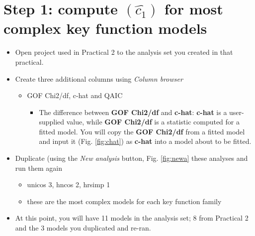 \documentclass[a4paper, 10pt]{article}
\begin{document}
\section{Step 1: compute $(\hat{c_1})$ for most complex key function models}

\begin{itemize}
	\item Open project used in Practical 2 to the analysis set you created in that practical.
	\item Create three additional columns using \emph{Column browser}
	\begin{itemize}
		\item GOF Chi2/df, c-hat and QAIC
		\begin{itemize}
			\item The difference between \textbf{GOF Chi2/df} and \textbf{c-hat}: \textbf{c-hat} is a user-supplied value, while \textbf{GOF Chi2/df} is a statistic computed for a fitted model.  You will copy the \textbf{GOF Chi2/df} from a fitted model and input it (Fig. \ref{fig:chat}) as \textbf{c-hat} into a model about to be fitted.
		\end{itemize}
	\end{itemize}
	\item Duplicate (using the \emph{New analysis} button, Fig. \ref{fig:newa} these analyses and run them again
		\begin{itemize}
			\item unicos 3, hncos 2, hrsimp 1
			\item these are the most complex models for each key function family
		\end{itemize}
	\item At this point, you will have 11 models in the analysis set; 8 from Practical 2 and the 3 models you duplicated and re-ran.
\end{itemize}

{
}
\end{document}
